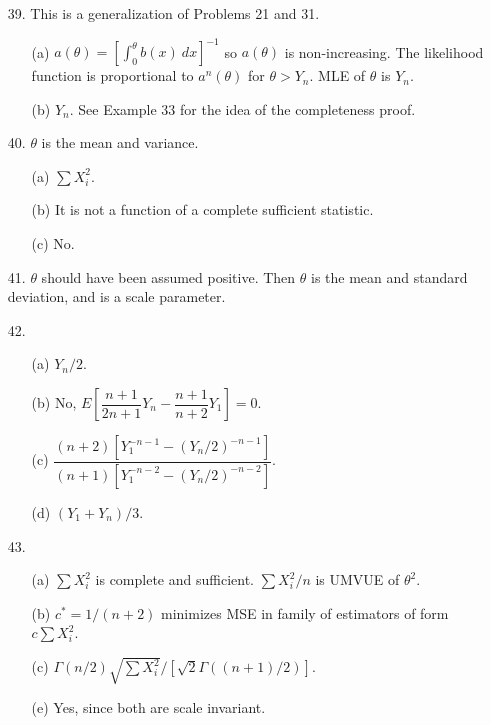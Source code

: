 \begin{enumerate}
	\newpage
	  
	\item[39.] This is a generalization of Problems 21 and 31.
	\begin{enumerate}
		\item[(a)] $a(\theta) = \displaystyle [\int_0^\theta b(x)\ dx]^{-1}$ so $a(\theta)$ is non-increasing.  The likelihood function is proportional to $a^n(\theta)$ for $\theta > Y_n$. MLE of $\theta$ is $Y_n$.
		\item[(b)] $Y_n$. See Example 33 for the idea of the completeness proof.
	\end{enumerate}
	  
	\item[40.] $\theta$ is the mean and variance.
	\begin{enumerate}
		\item[(a)] $\sum X_i^2$.
		\item[(b)] It is not a function of a complete sufficient statistic.
		\item[(c)] No.
	\end{enumerate}
	
	\item[41.] $\theta$ should have been assumed positive. Then $\theta$ is the mean and standard deviation, and is a scale parameter.
	  
	\item[42.] \begin{enumerate}
		\item[(a)] $Y_n/2$.
		\item[(b)] No, $E[\dfrac{n+1}{2n+1}\!Y_n - \dfrac{n+1}{n+2}\!Y_1] = 0$.
		\item[(c)] $\dfrac{(n+2)[Y^{-n-1}_1 - (Y_n/2)^{-n-1}]}{(n+1)[Y^{-n-2}_1 - (Y_n/2)^{-n-2}]}$.
		\item[(d)] $(Y_1+Y_n)/3$.
	\end{enumerate}
	  
	\item[43.] \begin{enumerate}
		\item[(a)] $\sum X_i^2$ is complete and sufficient. $\sum X_i^2/n$ is UMVUE of $\theta^2$.
		\item[(b)] $c^* = 1/(n+2)$ minimizes MSE in family of estimators of form $c\sum X_i^2$.
		\item[(c)] $\Gamma(n/2)\sqrt{\sum X_i^2}/[\sqrt{2}\Gamma((n+1)/2)]$.
		\item[(e)] Yes, since both are scale invariant.
	\end{enumerate}	 
	  

\end{enumerate}
